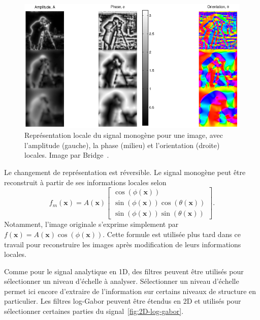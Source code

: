 \bigskip

\begin{figure}
    \centering
    \includegraphics[width=\textwidth]{contenu/resources/images/local_information_monogenic}
    \caption[Représentation locale du signal monogène]{Représentation locale du signal monogène pour une image, avec l'amplitude (gauche), la phase (milieu) et l'orientation (droite) locales. Image par Bridge~\cite{bridge_introduction_2018}.}
    \label{fig:monogenic-local-representation}
\end{figure}

Le changement de représentation est réversible. Le signal monogène peut être reconstruit à partir de ses informations locales selon
\begin{equation}
    f_m(\mathbf{x}) = A(\mathbf{x})\left[
        \begin{array}{c}
        \cos(\phi(\mathbf{x})) \\
        \sin(\phi(\mathbf{x}))\cos(\theta(\mathbf{x})) \\
        \sin(\phi(\mathbf{x}))\sin(\theta(\mathbf{x}))
        \end{array}
    \right].
\end{equation}
Notamment, l'image originale s'exprime simplement par $f(\mathbf{x}) = A(\mathbf{x})\cos(\phi(\mathbf{x}))$. Cette formule est utilisée plus tard dans ce travail pour reconstruire les images après modification de leurs informations locales.

\bigskip

Comme pour le signal analytique en 1D, des filtres peuvent être utilisés pour sélectionner un niveau d'échelle à analyser. Sélectionner un niveau d'échelle permet ici encore d'extraire de l'information sur certains niveaux de structure en particulier. Les filtres log-Gabor peuvent être étendus en 2D et utilisés pour sélectionner certaines parties du signal~\ref{fig:2D-log-gabor}.

